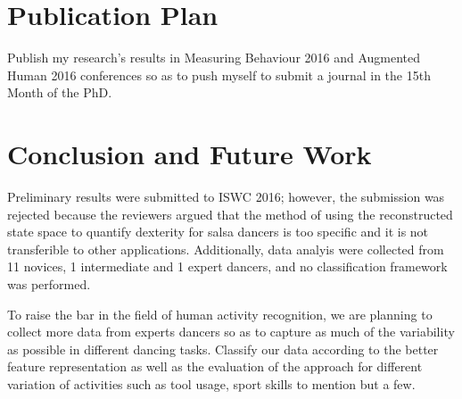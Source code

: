 \documentclass[10pt,journal,compsoc]{IEEEtran}
\begin{document}
\section{Publication Plan}

Publish my research's results in Measuring Behaviour 2016
and Augmented Human 2016 conferences so as to push myself 
to submit a journal in the 15th Month of the PhD.


\section{Conclusion and Future Work} 
Preliminary results were submitted to ISWC 2016; however, the 
submission was rejected because the reviewers argued that 
the method of using the reconstructed state space 
to quantify dexterity for salsa dancers is too specific and
it is not transferible to other applications. Additionally, 
data analyis were collected from 11 novices, 1 intermediate and 1 expert dancers,
and no classification framework was performed. 


To raise the bar in the field of human activity recognition,
we are planning to collect more data from experts dancers so as to 
capture as much of the variability as possible in different dancing tasks.
Classify our data according to the better feature representation as well as 
the evaluation of the approach for different variation of activities such as 
tool usage, sport skills to mention but a few.








% 
% 


\end{document}
